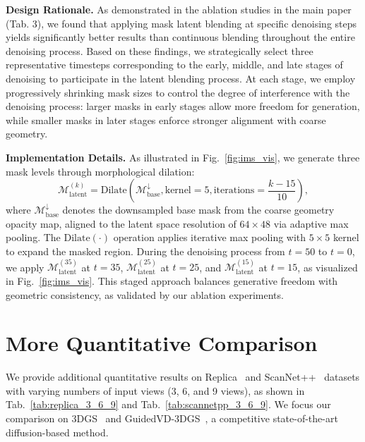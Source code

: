 \documentclass[runningheads]{llncs}
\begin{document}
\noindent\textbf{Design Rationale.} 
As demonstrated in the ablation studies in the main paper (Tab. 3), we found that applying mask latent blending at specific denoising steps yields significantly better results than continuous blending throughout the entire denoising process. Based on these findings, we strategically select three representative timesteps corresponding to the early, middle, and late stages of denoising to participate in the latent blending process. At each stage, we employ progressively shrinking mask sizes to control the degree of interference with the denoising process: larger masks in early stages allow more freedom for generation, while smaller masks in later stages enforce stronger alignment with coarse geometry.




\noindent\textbf{Implementation Details.}
As illustrated in Fig.~\ref{fig:ims_vis}, we generate three mask levels through morphological dilation:
\begin{equation}
\mathcal{M}_{\text{latent}}^{(k)} = \text{Dilate}(\mathcal{M}_{\text{base}}^{\downarrow}, \text{kernel}=5, \text{iterations}=\frac{k-15}{10}),
\end{equation}
where $\mathcal{M}_{\text{base}}^{\downarrow}$ denotes the downsampled base mask from the coarse geometry opacity map, aligned to the latent space resolution of $64 \times 48$ via adaptive max pooling. The $\text{Dilate}(\cdot)$ operation applies iterative max pooling with $5 \times 5$ kernel to expand the masked region. During the denoising process from $t = 50$ to $t = 0$, we apply $\mathcal{M}_{\text{latent}}^{(35)}$ at $t = 35$, $\mathcal{M}_{\text{latent}}^{(25)}$ at $t = 25$, and $\mathcal{M}_{\text{latent}}^{(15)}$ at $t = 15$, as visualized in Fig.~\ref{fig:ims_vis}. This staged approach balances generative freedom with geometric consistency, as validated by our ablation experiments.






\section{More Quantitative Comparison}
\label{sec:quant}
We provide additional quantitative results on Replica~\cite{straub2019replica} and ScanNet++~\cite{yeshwanth2023scannet++} datasets with varying numbers of input views (3, 6, and 9 views), as shown in Tab.~\ref{tab:replica_3_6_9} and Tab.~\ref{tab:scannetpp_3_6_9}. We focus our comparison on 3DGS~\cite{kerbl20233d} and GuidedVD-3DGS~\cite{zhong2025taming}, a competitive state-of-the-art diffusion-based method.
\end{document}
